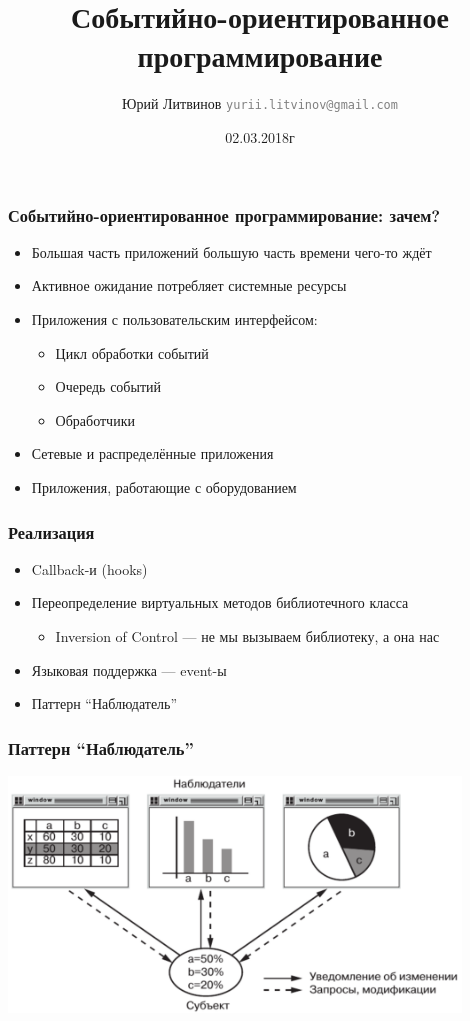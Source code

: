 \documentclass[xetex,mathserif,serif]{beamer}
\title{Событийно-ориентированное программирование}
\author[Юрий Литвинов]{Юрий Литвинов \newline \textcolor{gray}{\small\texttt{yurii.litvinov@gmail.com}}}
\date{02.03.2018г}
\begin{document}
	
	\frame{\titlepage}

	\begin{frame}
		\frametitle{Событийно-ориентированное программирование: зачем?}
		\begin{itemize}
			\item Большая часть приложений большую часть времени чего-то ждёт
			\item Активное ожидание потребляет системные ресурсы
			\item Приложения с пользовательским интерфейсом:
			\begin{itemize}
				\item Цикл обработки событий
				\item Очередь событий
				\item Обработчики
			\end{itemize}
			\item Сетевые и распределённые приложения
			\item Приложения, работающие с оборудованием
		\end{itemize}
	\end{frame}

	\begin{frame}
		\frametitle{Реализация}
		\begin{itemize}
			\item Callback-и (hooks)
			\item Переопределение виртуальных методов библиотечного класса
			\begin{itemize}
				\item Inversion of Control --- не мы вызываем библиотеку, а она нас
			\end{itemize}
			\item Языковая поддержка --- event-ы
			\item Паттерн ``Наблюдатель''
		\end{itemize}
	\end{frame}

	\begin{frame}
		\frametitle{Паттерн ``Наблюдатель''}
		\begin{center}
			\includegraphics[width=0.9\textwidth]{observerExample.png}
		\end{center}
	\end{frame}
\end{document}
